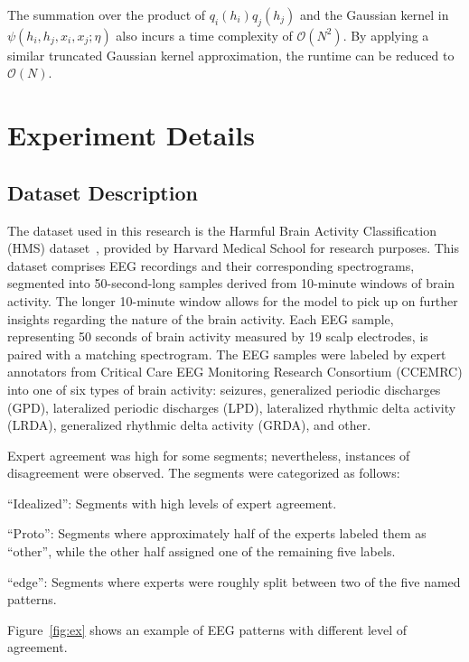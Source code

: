 \documentclass[conference]{IEEEtran}
\newcommand{\Oc}{\mathcal{O}}
\begin{document}
The summation over the product of $q_i(h_i)q_j(h_j)$ and the Gaussian kernel
in $\psi(h_i, h_j, x_i, x_j; \eta)$ also incurs a time complexity of $\Oc(N^2)$.
By applying a similar truncated Gaussian kernel approximation, the runtime can
be reduced to $\Oc(N)$.


\section{Experiment Details}


\subsection{Dataset Description}


The dataset used in this research is the Harmful Brain Activity Classification
(HMS) dataset~\citep{jing2023development}, provided by Harvard Medical School
for research purposes. This dataset comprises EEG recordings and their
corresponding spectrograms, segmented into 50-second-long samples derived from
10-minute windows of brain activity.
The longer 10-minute window allows for the model to pick up on further insights
regarding the nature of the brain activity. Each EEG sample, representing 50
seconds of brain activity measured by 19 scalp electrodes, is paired with a
matching spectrogram.
The EEG samples were labeled by expert annotators from Critical Care EEG
Monitoring Research Consortium (CCEMRC) into one of six types of brain
activity: seizures, generalized periodic discharges (GPD), lateralized
periodic discharges (LPD), lateralized rhythmic delta activity (LRDA),
generalized rhythmic delta activity (GRDA), and other.


Expert agreement was high for some segments; nevertheless, instances of
disagreement were observed. The segments were categorized as follows:
\begin{enumerate*}[label = (\roman*)]
\item ``Idealized'': Segments with high levels of expert agreement.
\item ``Proto'': Segments where approximately half of the experts labeled them
as ``other'', while the other half assigned one of the remaining five labels.
\item ``edge'': Segments where experts were roughly split between two of the
five named patterns.
\end{enumerate*}
Figure~\ref{fig:ex} shows an example of EEG patterns with different level of
agreement.
\end{document}
